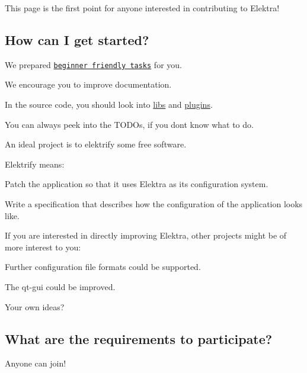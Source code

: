 This page is the first point for anyone interested in contributing to Elektra!

\subsection*{How can I get started?}

We prepared \href{https://github.com/ElektraInitiative/libelektra/issues?q=is%3Aissue+is%3Aopen+label%3A%22beginner+friendly%22}{\tt beginner friendly tasks} for you.


\begin{DoxyItemize}
\item We encourage you to improve documentation.
\item In the source code, you should look into \hyperlink{md_src_libs_README_src_libs_README_md}{libs} and \hyperlink{md_src_plugins_README_src_plugins_README_md}{plugins}.
\item You can always peek into the T\+O\+D\+Os, if you don\textquotesingle{}t know what to do.
\item An ideal project is to elektrify some free software.
\end{DoxyItemize}

Elektrify means\+:


\begin{DoxyItemize}
\item Patch the application so that it uses Elektra as its configuration system.
\item Write a specification that describes how the configuration of the application looks like.
\end{DoxyItemize}

If you are interested in directly improving Elektra, other projects might be of more interest to you\+:


\begin{DoxyItemize}
\item Further configuration file formats could be supported.
\item The qt-\/gui could be improved.
\item Your own ideas?
\end{DoxyItemize}

\subsection*{What are the requirements to participate?}

Anyone can join!

